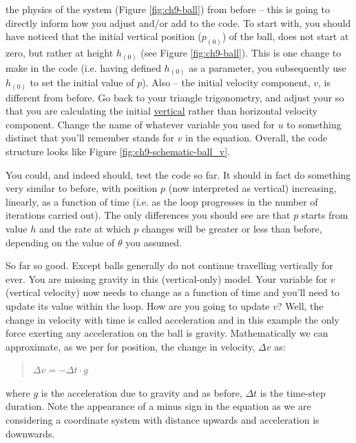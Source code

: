 \documentclass{tufte-book} %
\newenvironment{docspec}{\begin{quotation}\ttfamily\parskip0pt\parindent0pt\ignorespaces}{\end{quotation}}
\begin{document}
 the physics of the system (Figure \ref{fig:ch9-ball}) from before -- this is going to directly inform how you adjust and/or add to the code. To start with, you should have noticed that the initial vertical position (\(p_{(0)}\)) of the ball, does not start at zero, but rather at height \(h_{(0)}\) (see Figure \ref{fig:ch9-ball}). This is one change to make in the code (i.e. having defined \(h_{(0)}\) as a parameter, you subsequently use \(h_{(0)}\) to set the initial value of \(p\)). Also -- the initial velocity component, \(v\), is different from before. Go back to your triangle trigonometry,  and adjust your so that you are calculating  the initial \uline{vertical} rather than horizontal velocity component. Change the name of whatever variable you used for \(u\) to something distinct that you'll remember stands for \(v\) in the equation. Overall, the code structure looks like Figure \ref{fig:ch9-schematic-ball_v}.

You could, and indeed should, test the code so far. It should in fact do something very similar to before, with position \(p\) (now interpreted as vertical) increasing, linearly, as a function of time (i.e. as the loop progresses in the number of iterations carried out). The only differences you should see are that \(p\) starts from value \(h\) and the rate at which \(p\) changes will be greater or less than before, depending on the value of \(\theta\) you assumed.

So far so good. Except balls generally do not continue travelling vertically for ever. You are missing gravity in this (vertical-only) model. Your variable for \(v\) (vertical velocity) now needs to change as a function of time and you'll need to update its value within the loop. How are you going to update \(v\)? Well, the change in velocity with time is called acceleration and in this example the only force exerting any acceleration on the ball is gravity. Mathematically we can approximate, as we per for position, the change in velocity, \(\Delta v\) as:
\begin{docspec}
\(\Delta v=-\Delta t\cdot g\)
\end{docspec}
where \(g\) is the acceleration due to gravity and as before, \(\Delta t\) is the time-step duration. Note the appearance of a minus sign in the equation as we are considering a coordinate system with distance upwards and acceleration is downwards.
\end{document}
